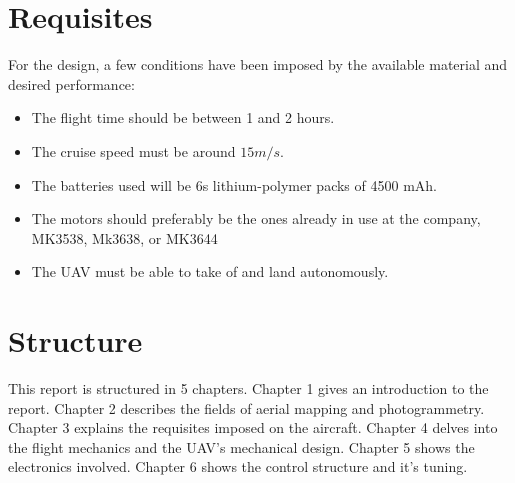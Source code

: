 \section{Requisites}

For the design, a few conditions have been imposed by the available material and desired performance:

\begin{itemize}

\item The flight time should be between 1 and 2 hours.
\item The cruise speed must be around $15 m/s$.
\item The batteries used will be 6s lithium-polymer packs of 4500 mAh.
\item The motors should preferably be the ones already in use at the company, MK3538, Mk3638, or MK3644
\item The UAV must be able to take of and land autonomously.

\end{itemize}


\section{Structure}

%
This report is structured in 5 chapters.
%
Chapter 1 gives an introduction to the report.
%
Chapter 2 describes the fields of aerial mapping and photogrammetry.
%
Chapter 3 explains the requisites imposed on the aircraft.
%
Chapter 4 delves into the flight mechanics and the UAV's mechanical design.
%
Chapter 5 shows the electronics involved.
%
Chapter 6 shows the control structure and it's tuning.


